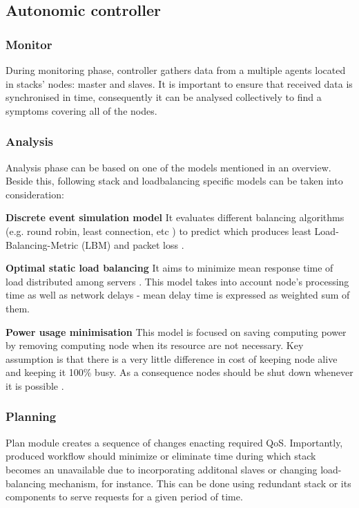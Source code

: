 \subsection{Autonomic controller}

\subsubsection{Monitor}
During monitoring phase, controller gathers data from a multiple agents located in stacks' nodes: master and slaves. It is important to ensure that received data is synchronised in time, consequently it can be analysed collectively to find a symptoms covering all of the nodes.

\subsubsection{Analysis}
Analysis phase can be based on one of the models mentioned in an overview. Beside this, following stack and loadbalancing specific models can be taken into consideration:
\begin{asparaenum}
 \item[\textbf{Discrete event simulation model}] It evaluates different balancing algorithms (e.g. round robin, least connection, etc ) to predict which produces least Load-Balancing-Metric (LBM) and packet loss \cite{idziorek2010discrete}.
 \item[\textbf{Optimal static load balancing}] It aims to minimize mean response time of load distributed among servers \cite{tantawi1985optimal}. This model takes into account node's processing time as well as network delays - mean delay time is expressed as weighted sum of them.
 \item[\textbf{Power usage minimisation}] This model is focused on saving computing power by removing computing node when its resource are not necessary. Key assumption is that there is a very little difference in cost of keeping node alive and keeping it 100\% busy. As a consequence nodes should be shut down whenever it is possible \cite{pinheiro2001load}.
\end{asparaenum}


\subsubsection{Planning}
Plan module creates a sequence of changes enacting required QoS. Importantly, produced workflow should minimize or eliminate time during which stack becomes an unavailable due to incorporating additonal slaves or changing load-balancing mechanism, for instance. This can be done using redundant stack or its components to serve requests for a given period of time.

